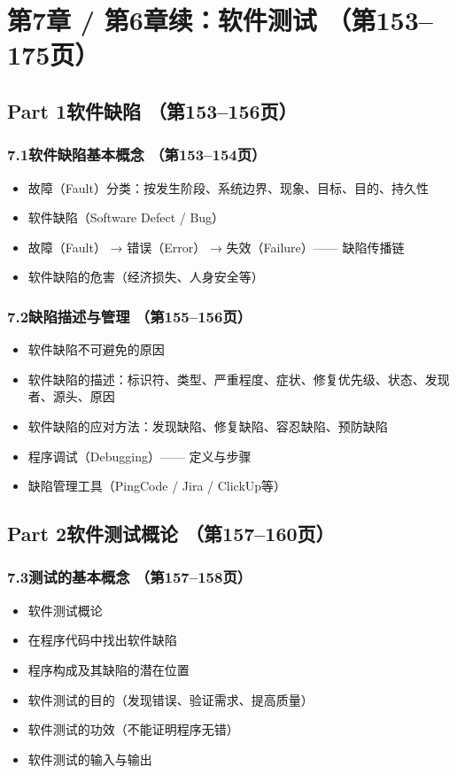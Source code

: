 \documentclass[12pt,a4paper]{ctexart}
\begin{document}
\section{第7章 / 第6章续：软件测试 \hfill（第153--175页）}

\subsection{Part 1\quad 软件缺陷 \hfill（第153--156页）}

\subsubsection{7.1\quad 软件缺陷基本概念 \hfill（第153--154页）}
\begin{itemize}
    \item 故障（Fault）分类：按发生阶段、系统边界、现象、目标、目的、持久性
    \item 软件缺陷（Software Defect / Bug）
    \item 故障（Fault） → 错误（Error） → 失效（Failure）—— 缺陷传播链
    \item 软件缺陷的危害（经济损失、人身安全等）
\end{itemize}

\subsubsection{7.2\quad 缺陷描述与管理 \hfill（第155--156页）}
\begin{itemize}
    \item 软件缺陷不可避免的原因
    \item 软件缺陷的描述：标识符、类型、严重程度、症状、修复优先级、状态、发现者、源头、原因
    \item 软件缺陷的应对方法：发现缺陷、修复缺陷、容忍缺陷、预防缺陷
    \item 程序调试（Debugging）—— 定义与步骤
    \item 缺陷管理工具（PingCode / Jira / ClickUp等）
\end{itemize}

\subsection{Part 2\quad 软件测试概论 \hfill（第157--160页）}

\subsubsection{7.3\quad 测试的基本概念 \hfill（第157--158页）}
\begin{itemize}
    \item 软件测试概论
    \item 在程序代码中找出软件缺陷
    \item 程序构成及其缺陷的潜在位置
    \item 软件测试的目的（发现错误、验证需求、提高质量）
    \item 软件测试的功效（不能证明程序无错）
    \item 软件测试的输入与输出
\end{itemize}
\end{document}
